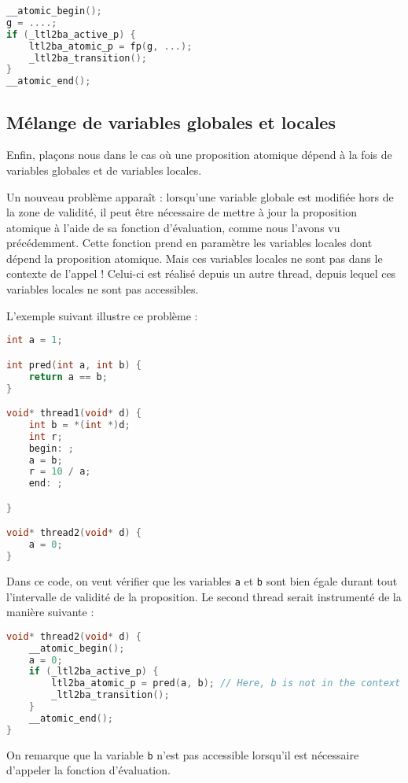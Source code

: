 \begin{lstlisting}[language=C]
__atomic_begin();
g = ....;
if (_ltl2ba_active_p) {
    ltl2ba_atomic_p = fp(g, ...);
    _ltl2ba_transition();
}
__atomic_end();
\end{lstlisting}

\subsection{Mélange de variables globales et locales}

Enfin, plaçons nous dans le cas où une proposition atomique dépend à la
fois de variables globales et de variables locales.

Un nouveau problème apparaît : lorsqu'une variable globale est modifiée
hors de la zone de validité, il peut être nécessaire de mettre à jour la
proposition atomique à l'aide de sa fonction d'évaluation, comme nous
l'avons vu précédemment. Cette fonction prend en paramètre les variables
locales dont dépend la proposition atomique. Mais ces variables locales
ne sont pas dans le contexte de l'appel ! Celui-ci est réalisé depuis un
autre thread, depuis lequel ces variables locales ne sont pas
accessibles.

L'exemple suivant illustre ce problème :

\begin{lstlisting}[language=C]
int a = 1;

int pred(int a, int b) {
    return a == b;
}

void* thread1(void* d) {
    int b = *(int *)d;
    int r;
    begin: ;
    a = b;
    r = 10 / a;
    end: ;

}

void* thread2(void* d) {
    a = 0;
}
\end{lstlisting}

Dans ce code, on veut vérifier que les variables \lstinline!a! et
\lstinline!b! sont bien égale durant tout l'intervalle de validité de la
proposition. Le second thread serait instrumenté de la manière suivante
:

\begin{lstlisting}[language=C]
void* thread2(void* d) {
    __atomic_begin();
    a = 0;
    if (_ltl2ba_active_p) {
        ltl2ba_atomic_p = pred(a, b); // Here, b is not in the context
        _ltl2ba_transition();
    }
    __atomic_end();
}
\end{lstlisting}

On remarque que la variable \lstinline!b! n'est pas accessible lorsqu'il
est nécessaire d'appeler la fonction d'évaluation.


